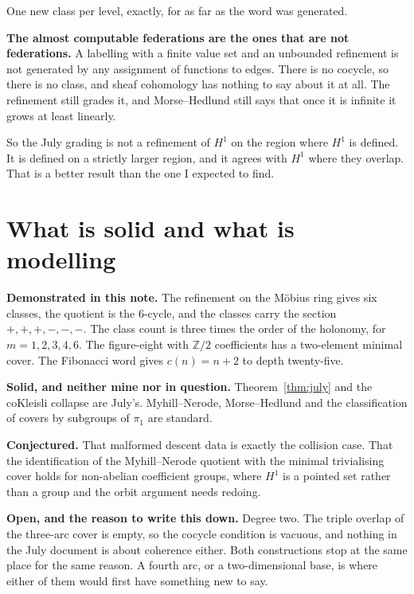 \documentclass[11pt,a4paper]{article}
\begin{document}
One new class per level, exactly, for as far as the word was generated.

\begin{sectionbox}
\textbf{The almost computable federations are the ones that are not federations.}
A labelling with a finite value set and an unbounded refinement is not generated
by any assignment of functions to edges. There is no cocycle, so there is no
class, and sheaf cohomology has nothing to say about it at all. The refinement
still grades it, and Morse--Hedlund still says that once it is infinite it grows
at least linearly.

So the July grading is not a refinement of $H^1$ on the region where $H^1$ is
defined. It is defined on a strictly larger region, and it agrees with $H^1$
where they overlap. That is a better result than the one I expected to find.
\end{sectionbox}

\section{What is solid and what is modelling}

\begin{alarmbox}
\textbf{Demonstrated in this note.} The refinement on the M\"obius ring gives six
classes, the quotient is the 6-cycle, and the classes carry the section
$+,+,+,-,-,-$. The class count is three times the order of the holonomy, for
$m = 1,2,3,4,6$. The figure-eight with $\mathbb{Z}/2$ coefficients has a
two-element minimal cover. The Fibonacci word gives $c(n) = n+2$ to depth
twenty-five.

\textbf{Solid, and neither mine nor in question.} Theorem~\ref{thm:july} and the
coKleisli collapse are July's. Myhill--Nerode, Morse--Hedlund and the
classification of covers by subgroups of $\pi_1$ are standard.

\textbf{Conjectured.} That malformed descent data is exactly the collision case.
That the identification of the Myhill--Nerode quotient with the minimal
trivialising cover holds for non-abelian coefficient groups, where $H^1$ is a
pointed set rather than a group and the orbit argument needs redoing.

\textbf{Open, and the reason to write this down.} Degree two. The triple overlap
of the three-arc cover is empty, so the cocycle condition is vacuous, and
nothing in the July document is about coherence either. Both constructions stop
at the same place for the same reason. A fourth arc, or a two-dimensional base,
is where either of them would first have something new to say.
\end{alarmbox}
\end{document}

